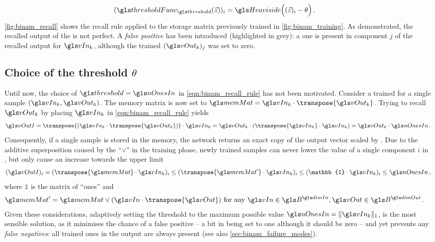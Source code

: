 \begin{align}
	(\thresholdFunc_{\threshold}(\vec z))_i
		&= \Heaviside\Big((\vec z)_i - \theta\Big) \,.
	\label{eqn:binam_threshold}
\end{align}
\cref{fig:binam_recall} shows the recall rule applied to the storage matrix \memMat previously trained in \cref{fig:binam_training}. As demonstrated, the recalled output of the \BiNAM is not perfect. A \emph{false positive} has been introduced (highlighted in grey): a one is present in component $j$ of the recalled output for \(\vIn_k\), although the trained \((\vOut_k)_j\) was set to zero.

\subsection{Choice of the threshold $\theta$}
\label{sec:binam_threshold}

Until now, the choice of \(\threshold = \nOnesIn\) in \cref{eqn:binam_recall_rule} has not been motivated. Consider a \BiNAM trained for a single sample \((\vIn_k, \vOut_k)\). The memory matrix is now set to $\memMat = \vIn_k \cdot \transpose{\vOut_k}$. Trying to recall \(\vOut_k\) by placing \(\vIn_k\) in \cref{eqn:binam_recall_rule} yields
\begin{align}
	\vOutI = \transpose{(\vIn_k \cdot \transpose{\vOut_k})} \cdot \vIn_k = \vOut_k \cdot (\transpose{\vIn_k} \cdot \vIn_k) = \vOut_k \cdot \nOnesIn \,.
\end{align}
Consequently, if a single sample is stored in the memory, the network returns an exact copy of the output vector \vOut scaled by \nOnesIn. Due to the additive superposition caused by the \enquote{$\vee$} in the training phase, newly trained samples can never lower the value of a single component $i$ in \vOutI, but only cause an increase towards the upper limit \nOnesIn
\begin{align}
	(\vOutI)_i = (\transpose{\memMat} \cdot \vIn_k)_i \leq (\transpose{\memMat'} \cdot \vIn_k)_i \leq (\mathbb{1} \cdot \vIn_k)_i \leq \nOnesIn \,,
\end{align}
where $\mathbb{1}$ is the matrix of \enquote{ones} and
\begin{align}
	\memMat' &= \memMat \vee (\vIn \cdot \transpose{\vOut}) \text{ for any } \vIn \in \B^{\dimIn}, \vOut \in \B^{\dimOut}\,.
\end{align}
Given these considerations, adaptively setting the threshold \threshold to the maximum possible value $\nOnesIn = \|\vIn_k\|_1$, is the most sensible solution, as it minimises the chance of a false positive -- a bit in \vOut being set to one although it should be zero -- and yet prevents any \emph{false negatives}: all trained ones in the output are always present (see also \cref{sec:binam_failure_modes}).

